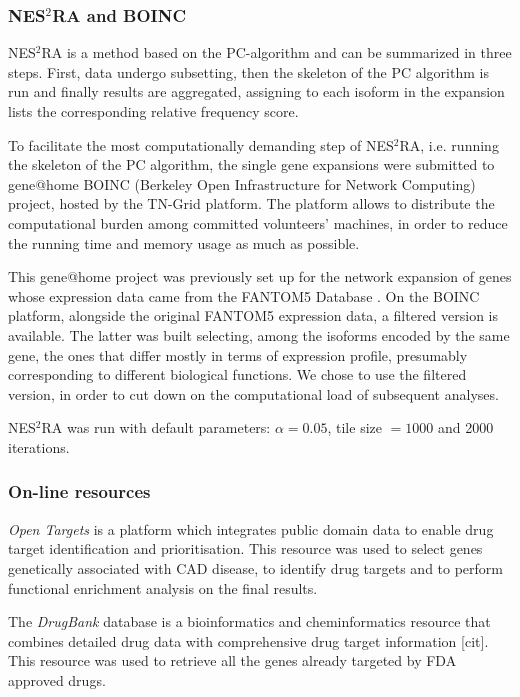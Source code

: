 \documentclass[fleqn,10pt]{SelfArx} %
\begin{document}
\subsubsection*{NES$^2$RA and BOINC}
NES$^2$RA is a method based on the PC-algorithm \cite{PC-alg} and can be summarized in three steps. First, data undergo subsetting, then the skeleton of the PC algorithm is run and finally results are aggregated, assigning to each isoform in the expansion lists the corresponding relative frequency score.

\setlength\emergencystretch{\textwidth}
To facilitate the most computationally demanding step of NES$^2$RA, i.e. running the skeleton of the PC algorithm, the single gene expansions were submitted to gene@home \cite{boinc, realBoinc} BOINC (Berkeley Open Infrastructure for Network Computing) project, hosted by the TN-Grid platform. The platform allows to distribute the computational burden among committed volunteers' machines, in order to reduce the running time and memory usage as much as possible.

This gene@home project was previously set up for the network expansion of genes whose expression data came from the FANTOM5 Database \cite{fantom}. On the BOINC platform, alongside the original FANTOM5 expression data, a filtered version is available. The latter was built selecting, among the isoforms encoded by the same gene, the ones that differ mostly in terms of expression profile, presumably corresponding to different biological functions. We chose to use the filtered version, in order to cut down on the computational load of subsequent analyses.

NES$^2$RA was run with default parameters: $\alpha=0.05$, tile size $=1000$ and 2000 iterations.

\subsubsection*{On-line resources}
\emph{Open Targets} is a platform which integrates public domain data to enable drug target identification and prioritisation\cite{open, OpenTargetPlatform}. This resource was used to select genes genetically associated with CAD disease, to identify drug targets and to perform functional enrichment analysis on the final results.

The \emph{DrugBank} database is a bioinformatics and cheminformatics resource that combines detailed drug data with comprehensive drug target information [cit]. This resource was used to retrieve all the genes already targeted by FDA approved drugs.
\end{document}
